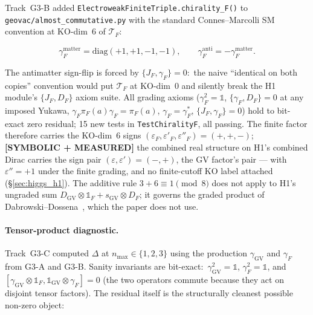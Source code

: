 \documentclass[11pt]{article}
\begin{document}
Track~G3-B added \texttt{ElectroweakFiniteTriple.chirality\_F()} to
\texttt{geovac/almost\_commutative.py} with the standard
Connes--Marcolli SM convention at KO-dim~6 of $\mathcal{T}_F$:

\begin{equation}
\gamma_F^{\mathrm{matter}} = \mathrm{diag}(+1, +1, -1, -1), \qquad
\gamma_F^{\mathrm{anti}} = -\gamma_F^{\mathrm{matter}}.
\end{equation}

The antimatter sign-flip is forced by $\{J_F, \gamma_F\} = 0$:\ the
naive ``identical on both copies'' convention would put
$\mathcal{T}_F$ at KO-dim~0 and silently break the H1 module's
$\{J_F, D_F\}$ axiom suite.  All grading axioms
($\gamma_F^2 = \mathbb{1}$, $\{\gamma_F, D_F\} = 0$ at any imposed
Yukawa, $\gamma_F \pi_F(a) \gamma_F = \pi_F(a)$,
$\gamma_F = \gamma_F^*$, $\{J_F, \gamma_F\} = 0$) hold to bit-exact
zero residual; 15 new tests in \texttt{TestChiralityF}, all passing.
The finite factor therefore carries the KO-dim~6 signs
$(\varepsilon_F, \varepsilon'_F, \varepsilon''_F) = (+, +, -)$;
\textbf{[SYMBOLIC + MEASURED]} the
combined real structure on H1's combined Dirac carries the sign pair
$(\varepsilon, \varepsilon') = (-, +)$, the GV factor's pair --- with
$\varepsilon'' = +1$ under the finite grading, and no finite-cutoff
KO label attached (\S\ref{sec:higgs_h1}).  The additive rule $3 + 6 \equiv 1 \pmod 8$
does not apply to H1's ungraded sum $D_{\mathrm{GV}} \otimes
\mathbb{1}_F + s_{\mathrm{GV}} \otimes D_F$; it governs the
graded product of Dabrowski--Dossena~\cite{dabrowski_dossena2011},
which the paper does not use.

\paragraph{Tensor-product diagnostic.}  Track~G3-C computed $\Delta$
at $n_{\max} \in \{1, 2, 3\}$ using the production
$\gamma_{\mathrm{GV}}$ and $\gamma_F$ from G3-A and G3-B.  Sanity
invariants are bit-exact:\ $\gamma_{\mathrm{GV}}^2 = \mathbb{1}$,
$\gamma_F^2 = \mathbb{1}$, and
$[\gamma_{\mathrm{GV}} \otimes \mathbb{1}_F,
\mathbb{1}_{\mathrm{GV}} \otimes \gamma_F] = 0$ (the two operators
commute because they act on disjoint tensor factors).  The residual
itself is the structurally cleanest possible non-zero object:
\end{document}
